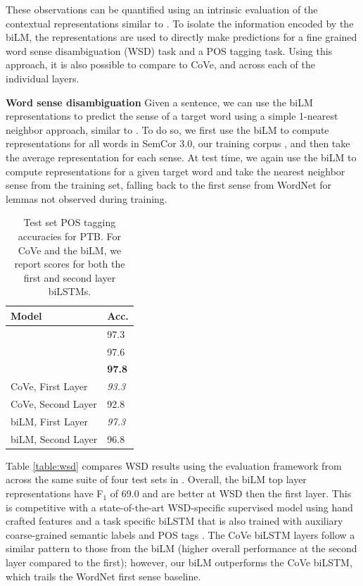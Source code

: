 \documentclass[11pt,a4paper]{article}
\newcommand{\tinysection}[1]{\textbf{#1}}
\begin{document}
These observations can be quantified using an intrinsic evaluation of the contextual representations similar to \citet{Belinkov2017WhatDN}.
To isolate the information encoded by the biLM, the representations are used to directly make predictions for
a fine grained word sense disambiguation (WSD) task and a POS tagging task.
Using this approach, it is also possible to compare to CoVe, and across each of the individual layers.

\tinysection{Word sense disambiguation}
Given a sentence, we can use the biLM representations to predict the sense of a target word using a simple 1-nearest neighbor approach, similar to \citet{Melamud2016context2vecLG}.
To do so, we first use the biLM to compute representations for all words in SemCor 3.0, our training corpus \citep{Miller1994UsingAS}, and then take the average representation for each sense.
At test time, we again use the biLM to compute representations for a given target word and take the nearest neighbor sense from the training set, falling back to the first sense from WordNet for lemmas not observed during training.

\begin{table}
\centering
\label{table:pos}
\begin{tabular}{l|l}
 \textbf{Model} & \textbf{Acc.} \\ \hline \hline
\citet{NLPfromScratch:Collobert2011} & 97.3 \\
\citet{Ma2016EndtoendSL} & 97.6 \\
\citet{Ling2015FindingFI} & \textbf{97.8} \\ \hline
CoVe, First Layer  & \textit{93.3} \\
CoVe, Second Layer  & 92.8 \\ \hline
biLM, First Layer  & \textit{97.3} \\
biLM, Second Layer  &  96.8
\end{tabular}
\caption{Test set POS tagging accuracies for PTB.
For CoVe and the biLM, we report scores for both the first and second layer biLSTMs.}
\end{table}

Table \ref{table:wsd} compares WSD results using the evaluation framework from \citet{Raganato2017WordSD} across the same suite of four test sets in \citet{Raganato2017NeuralSL}.
Overall, the biLM top layer representations have F$_1$ of 69.0 and are better at WSD then the first layer.
This is competitive with a state-of-the-art WSD-specific supervised model using hand crafted features \citep{Iacobacci2016EmbeddingsFW} and a task specific biLSTM that is also trained with auxiliary coarse-grained semantic labels and POS tags \citep{Raganato2017NeuralSL}.
The CoVe biLSTM layers follow a similar pattern to those from the biLM (higher overall performance at the second layer compared to the first); however, our biLM outperforms the CoVe biLSTM, which trails the WordNet first sense baseline.
\end{document}
